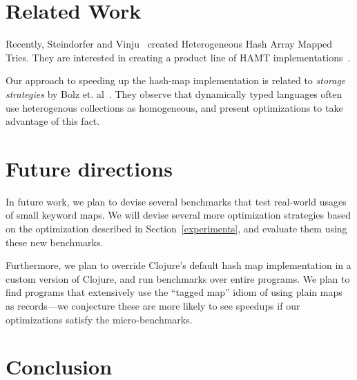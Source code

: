 \documentclass[preprint]{sigplanconf}
\begin{document}
\section{Related Work}

Recently, Steindorfer and Vinju~\cite{Steindorfer:2015:OHM:2814270.2814312}
created Heterogeneous Hash Array Mapped Tries.
They are interested in creating a product line of HAMT
implementations~\cite{Steindorfer:2016:TSP:2993236.2993251}.

Our approach to speeding up the hash-map implementation
is related to \textit{storage strategies}
by Bolz et. al~\cite{Bolz13storagestrategies}.
They observe that dynamically typed languages often use
heterogenous collections as homogeneous, and present
optimizations to take advantage of this fact.



\section{Future directions}

In future work, we plan to devise several benchmarks
that test real-world usages of small keyword maps.
We will devise several more optimization strategies
based on the optimization described in Section~\ref{experiments},
and evaluate them using these new benchmarks.

Furthermore, we plan to override Clojure's default hash map implementation
in a custom version of Clojure, and run benchmarks
over entire programs.
We plan to find programs that extensively use the ``tagged map''
idiom of using plain maps as records---we conjecture these
are more likely to see speedups if our optimizations
satisfy the micro-benchmarks.

\section{Conclusion}

\end{document}
